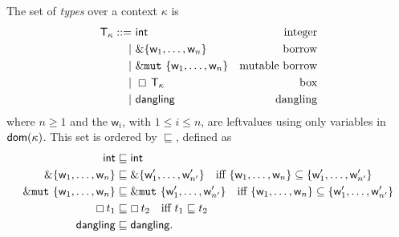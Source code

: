 \begin{definition}[Types]
  The set of \emph{types} over a context $\kappa$ is
  \begin{align*}
    \mathsf{T}_\kappa ::=&\ \mathsf{int} & \text{integer}\\
    | &\ \&\{\mathsf{w}_1,\ldots,\mathsf{w}_n\} & \text{borrow}\\
    | &\ \&\mathtt{mut}\ \{\mathsf{w}_1,\ldots,\mathsf{w}_n\} & \text{mutable borrow}\\
    | &\ \boxempty\,{\mathsf{T}_\kappa} & \text{box}\\
    | &\ \mathsf{dangling} & \text{dangling}
  \end{align*}
  where $n\ge 1$ and the $\mathsf{w}_i$, with $1\le i\le n$, are leftvalues
  using only variables in $\mathsf{dom}(\kappa)$. This set is ordered by $\sqsubseteq$, defined as
  \begin{align*}
    \mathsf{int}&\sqsubseteq\mathsf{int}\\
    \&\{\mathsf{w}_1,\ldots,\mathsf{w}_n\} & \sqsubseteq
    \&\{\mathsf{w}'_1,\ldots,\mathsf{w}'_{n'}\} \quad\text{iff $\{\mathsf{w}_1,\ldots,\mathsf{w}_n\}\subseteq\{\mathsf{w}'_1,\ldots,\mathsf{w}'_{n'}\}$}\\
    \&\mathtt{mut}\ \{\mathsf{w}_1,\ldots,\mathsf{w}_n\} & \sqsubseteq
    \&\mathtt{mut}\ \{\mathsf{w}'_1,\ldots,\mathsf{w}'_{n'}\} \quad\text{iff $\{\mathsf{w}_1,\ldots,\mathsf{w}_n\}\subseteq\{\mathsf{w}'_1,\ldots,\mathsf{w}'_{n'}\}$}\\
    \boxempty\,{t_1}&\sqsubseteq\boxempty\,{t_2} \quad\text{iff $t_1\sqsubseteq t_2$}\\
    \mathsf{dangling}&\sqsubseteq\mathsf{dangling.}
  \end{align*}
\end{definition}

